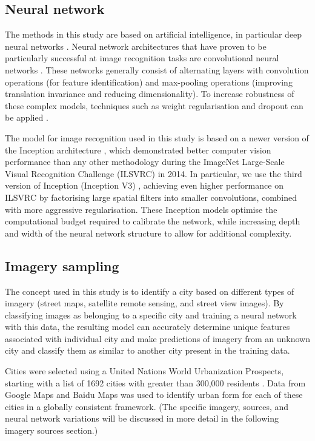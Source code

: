 \documentclass[10pt,letterpaper]{article}
\begin{document}
\subsection*{Neural network}\label{sec:methods1}

The methods in this study are based on artificial intelligence, in particular deep neural networks \cite{Bishop1995,Samarasinghe2016,Graupe2013}. Neural network architectures that have proven to be particularly successful at image recognition tasks are convolutional neural networks \cite{Schmidhuber2015}. These networks generally consist of alternating layers with convolution operations (for feature identification) and max-pooling operations (improving translation invariance and reducing dimensionality). To increase robustness of these complex models, techniques such as weight regularisation and dropout can be applied \cite{Srivastava2014}.

The model for image recognition used in this study is based on a newer version of the Inception architecture \cite{Szegedy2015}, which demonstrated better computer vision performance than any other methodology during the ImageNet Large-Scale Visual Recognition Challenge (ILSVRC) \cite{Russakovsky2015} in 2014. In particular, we use the third version of Inception (Inception V3) \cite{Szegedy2015a}, achieving even higher performance on ILSVRC by factorising large spatial filters into smaller convolutions, combined with more aggressive regularisation. These Inception models optimise the computational budget required to calibrate the network, while increasing depth and width of the neural network structure to allow for additional complexity.

\subsection*{Imagery sampling}\label{sec:methods2}

The concept used in this study is to identify a city based on different types of imagery (street maps, satellite remote sensing, and street view images). By classifying images as belonging to a specific city and training a neural network with this data, the resulting model can accurately determine unique features associated with individual city and make predictions of imagery from an unknown city and classify them as similar to another city present in the training data.

Cities were selected using a United Nations World Urbanization Prospects, starting with a list of 1692 cities with greater than 300,000 residents \cite{UN2014}. Data from Google Maps and Baidu Maps was used to identify urban form for each of these cities in a globally consistent framework. (The specific imagery, sources, and neural network variations will be discussed in more detail in the following imagery sources section.)
\end{document}
